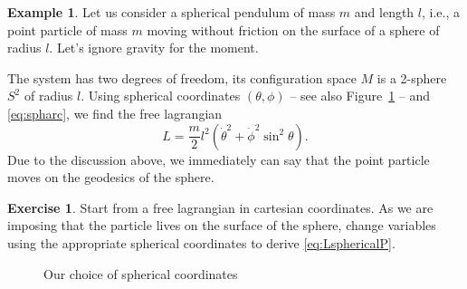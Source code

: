 \documentclass[english,fontsize=11pt,paper=b5]{scrbook}
\numberwithin{equation}{chapter}
\theoremstyle{definition}
\newtheorem{example}{Example}[chapter]
\newtheorem{exercise}{Exercise}[chapter]
\begin{document}
    \begin{example}\label{ex:sphericalP}
      Let us consider a spherical pendulum of mass $m$ and length $l$, i.e., a point particle of mass $m$ moving without friction on the surface of a sphere of radius $l$.
      Let's ignore gravity for the moment.

      The system has two degrees of freedom, its configuration space $M$ is a 2-sphere $S^2$ of radius $l$.
      Using spherical coordinates $(\theta, \phi)$ -- see also Figure~\ref{fig:sphcoords} -- and \eqref{eq:spharc}, we find the free lagrangian
      \begin{equation}\label{eq:LsphericalP}
        L = \frac m2 l^2(\dot \theta^2 + \dot \phi^2 \sin^2\theta).
      \end{equation}
      Due to the discussion above, we immediately can say that the point particle moves on the geodesics of the sphere.
    \end{example}

    \begin{exercise}
      Start from a free lagrangian in cartesian coordinates.
      As we are imposing that the particle lives on the surface of the sphere, change variables using the appropriate spherical coordinates to derive \eqref{eq:LsphericalP}.
    \end{exercise}

    \begin{figure}[ht]
      \centering
      \caption{Our choice of spherical coordinates}
      \label{fig:sphcoords}
    \end{figure}
\end{document}
